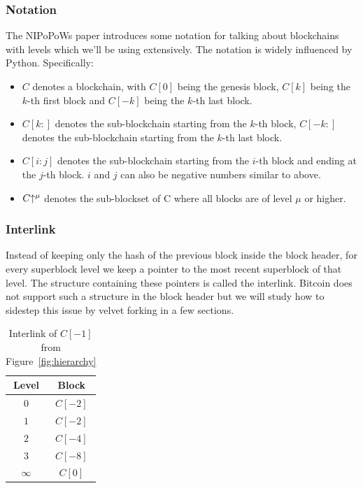 \documentclass[11pt]{llncs}
\begin{document}
\subsubsection{Notation}
The NIPoPoWs paper introduces some notation for talking about blockchains with levels which we'll be using extensively. The notation is widely influenced by Python. Specifically:

\begin{itemize}
  \item $C$ denotes a blockchain, with $C[0]$ being the genesis block, $C[k]$ being the $k$-th first block and $C[-k]$ being the $k$-th last block.
  \item $C[k:]$ denotes the sub-blockchain starting from the $k$-th block, $C[-k:]$ denotes the sub-blockchain starting from the $k$-th last block.
  \item $C[i:j]$ denotes the sub-blockchain starting from the $i$-th block and ending at the $j$-th block. $i$ and $j$ can also be negative numbers similar to above.
  \item $C\negthickspace\uparrow^\mu$ denotes the sub-blockset of C where all blocks are of level $\mu$ or higher.
\end{itemize}

\subsubsection{Interlink}
Instead of keeping only the hash of the previous block inside the block header,
for every superblock level we keep a pointer to the most recent superblock of that level. The structure
containing these pointers is called the interlink. Bitcoin does not support
such a structure in the block header but we will study how to sidestep this
issue by velvet forking in a few sections.

\begin{table}
  \centering
  \begin{tabular}{|c|c|}
    \hline
    Level & Block \\
    \hline
    $0$ & $C[-2]$ \\
    $1$ & $C[-2]$ \\
    $2$ & $C[-4]$ \\
    $3$ & $C[-8]$ \\
    $\infty$ & $C[0]$ \\
    \hline
  \end{tabular}
  \caption{Interlink of $C[-1]$ from Figure~\ref{fig:hierarchy}}
  \label{table:interlink-example}
\end{table}
\end{document}
